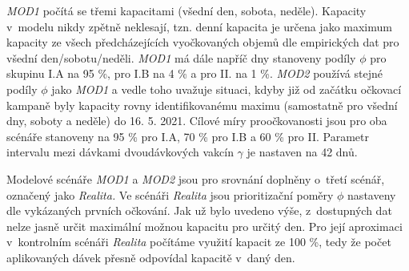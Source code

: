 \emph{MOD1} počítá se třemi kapacitami (všední den, sobota, neděle). Kapacity v~modelu nikdy zpětně neklesají, tzn. denní kapacita je určena jako maximum kapacity ze %
všech předcházejících vyočkovaných objemů dle empirických dat pro všední den/sobotu/neděli. \emph{MOD1} má dále napříč dny stanoveny podíly $\phi$ pro skupinu I.A na 95 \%, pro I.B na 4 \% a pro II. na 1 \%.
%
\emph{MOD2} používá stejné podíly  $\phi$ jako \emph{MOD1} a vedle toho uvažuje situaci, kdyby již od začátku očkovací kampaně byly kapacity rovny identifikovanému maximu (samostatně pro všední dny, soboty a neděle) do 16. 5. 2021. 
%
Cílové míry proočkovanosti jsou pro oba scénáře stanoveny na 95 \% pro I.A, 70 \% pro I.B a 60 \% pro II. Parametr intervalu mezi dávkami dvoudávkových vakcín $\gamma$ je nastaven na 42 dnů.


Modelové scénáře \emph{MOD1} a \emph{MOD2} jsou pro srovnání doplněny o~třetí scénář, označený jako \emph{Realita.}  Ve scénáři \emph{Realita} jsou prioritizační poměry $\phi$ nastaveny dle vykázaných prvních očkování. Jak už bylo uvedeno výše, z~dostupných dat nelze jasně určit maximální možnou kapacitu pro určitý den. Pro její aproximaci v~kontrolním scénáři \emph{Realita} počítáme využití kapacit ze 100 \%, tedy že počet aplikovaných dávek přesně odpovídal kapacitě v~daný den.




%


